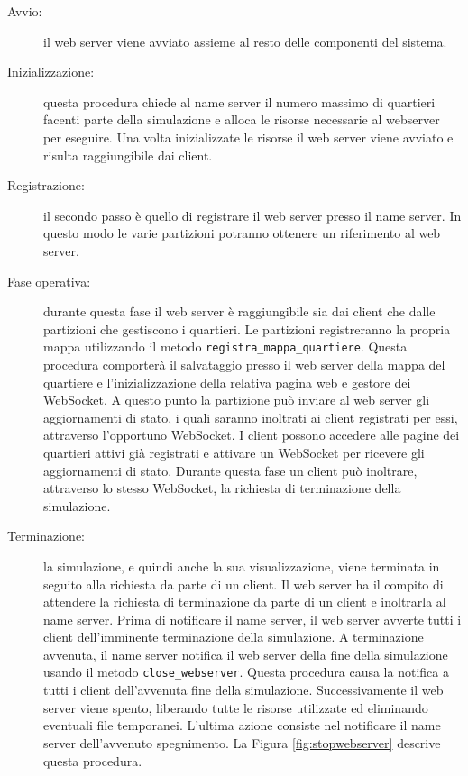\begin{description}
	\item[Avvio:] il web server viene avviato assieme al resto delle componenti del
	sistema.
	\item[Inizializzazione:] questa procedura chiede al name server il numero
	massimo di quartieri facenti parte della simulazione e alloca le risorse
	necessarie al webserver per eseguire. Una volta inizializzate le risorse il web
	server viene avviato e risulta raggiungibile dai client.
	\item[Registrazione:] il secondo passo è quello di registrare il web server
	presso il name server. In questo modo le varie partizioni potranno ottenere un
	riferimento al web server.
	\item[Fase operativa:] durante questa fase il web server è raggiungibile sia
	dai client che dalle partizioni che gestiscono i quartieri. Le partizioni
	registreranno la propria mappa utilizzando il metodo
	\texttt{registra\_mappa\_quartiere}. Questa procedura comporterà il salvataggio
	presso il web server della mappa del quartiere e l'inizializzazione della
	relativa pagina web e gestore dei WebSocket. A questo punto la partizione può
	inviare al web server gli aggiornamenti di stato, i quali saranno inoltrati ai
	client registrati per essi, attraverso l'opportuno WebSocket.
	I client possono accedere alle pagine dei quartieri attivi già registrati e
	attivare un WebSocket per ricevere gli aggiornamenti di stato.
	Durante questa fase un client può inoltrare, attraverso lo stesso WebSocket, la
	richiesta di terminazione della simulazione.
	\item[Terminazione:] la simulazione, e quindi anche la sua visualizzazione,
	viene terminata in seguito alla richiesta da parte di un client. Il web server
	ha il compito di attendere la richiesta di terminazione da parte di un client e
	inoltrarla al name server. Prima di notificare il name server, il web server
	avverte tutti i client dell'imminente terminazione della simulazione.
	A terminazione avvenuta, il name server notifica il web server della fine della
	simulazione usando il metodo \texttt{close\_webserver}. Questa procedura causa
	la notifica a tutti i client dell'avvenuta fine della simulazione.
	Successivamente il web server viene spento, liberando tutte le risorse utilizzate ed eliminando
	eventuali file temporanei. L'ultima azione consiste nel notificare il name
	server dell'avvenuto spegnimento. La Figura \ref{fig:stopwebserver} descrive
	questa procedura.
\end{description}

